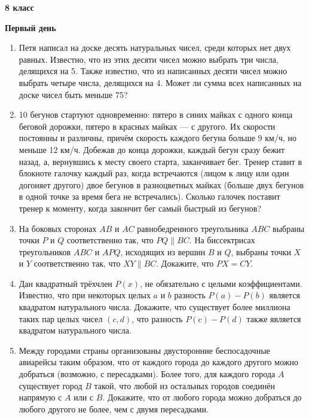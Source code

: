 \documentclass{article}
\begin{document}
    \large

    \begin{center}
        \LARGE\textbf{8 класс}
    \end{center}
    \begin{center}
        \large\textbf{Первый день}
    \end{center}


    \begin{enumerate}[label*=8.{\arabic{enumi}}]
        \setcounter{enumi}{0}
        \item Петя написал на доске десять натуральных чисел, среди которых нет двух равных.
        Известно, что из этих десяти чисел можно выбрать три числа, делящихся на 5.
        Также известно, что из написанных десяти чисел можно выбрать четыре числа, делящихся на 4.
        Может ли сумма всех написанных на доске чисел быть меньше 75?

        \item 10 бегунов стартуют одновременно: пятеро в синих майках с одного конца беговой дорожки, пятеро в красных майках — с другого.
        Их скорости постоянны и различны, причём скорость каждого бегуна больше 9 км/ч, но меньше 12 км/ч.
        Добежав до конца дорожки, каждый бегун сразу бежит назад, а, вернувшись к месту своего старта, заканчивает бег.
        Тренер ставит в блокноте галочку каждый раз, когда встречаются (лицом к лицу или один догоняет другого) двое бегунов в разноцветных майках (больше двух бегунов в одной точке за время бега не встречались).
        Сколько галочек поставит тренер к моменту, когда закончит бег самый быстрый из бегунов?

        \item На боковых сторонах $AB$ и $AC$ равнобедренного треугольника $ABC$ выбраны точки $P$ и $Q$ соответственно так, что $PQ \parallel BC$.
        На биссектрисах треугольников $ABC$ и $APQ$, исходящих из вершин $B$ и $Q$, выбраны точки $X$ и $Y$ соответственно так, что $XY \parallel BC$.
        Докажите, что $PX = CY$.

        \item Дан квадратный трёхчлен $P(x)$, не обязательно с целыми коэффициентами.
        Известно, что при некоторых целых $a$ и $b$ разность $P(a) - P(b)$ является квадратом натурального числа.
        Докажите, что существует более миллиона таких пар целых чисел $(c, d)$, что разность $P(c) - P(d)$ также является квадратом натурального числа.

        \item Между городами страны организованы двусторонние беспосадочные авиарейсы таким образом, что от каждого города до каждого другого можно добраться (возможно, с пересадками).
        Более того, для каждого города $A$ существует город $B$ такой, что любой из остальных городов соединён напрямую с $A$ или с $B$.
        Докажите, что от любого города можно добраться до любого другого не более, чем с двумя пересадками.

    \end{enumerate}
\end{document}
